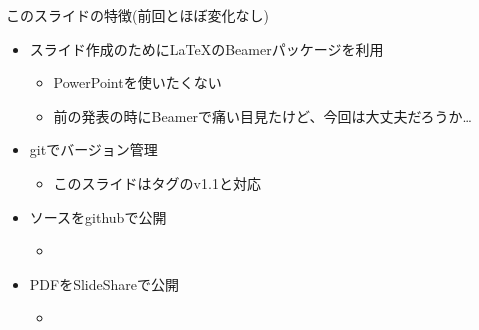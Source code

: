 \begin{frame}{このスライドの特徴(前回とほぼ変化なし)}
 \begin{itemize}
  \item スライド作成のために\LaTeX のBeamerパッケージを利用
        \begin{itemize}
         \item PowerPointを使いたくない
         \item 前の発表の時にBeamerで痛い目見たけど、今回は大丈夫だろうか…
        \end{itemize}
  \item gitでバージョン管理
        \begin{itemize}
         \item このスライドはタグのv1.1と対応
        \end{itemize}
  \item ソースをgithubで公開
        \begin{itemize}
         \item \href{https://github.com/sakabar/prml_titech_8-1_8-2}{}
        \end{itemize}
  \item PDFをSlideShareで公開
        \begin{itemize}
         \item \href{http://www.slideshare.net/takafumisakakibara75/slide-44207685}{}
        \end{itemize}
 \end{itemize}
\end{frame}
